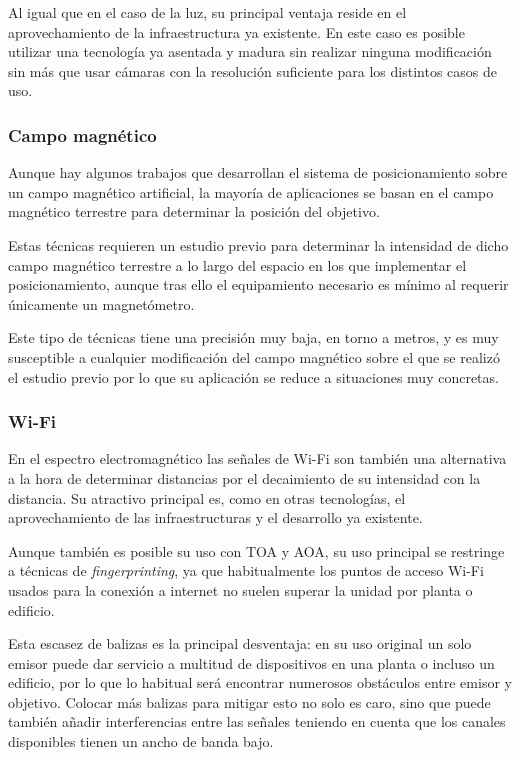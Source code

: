 Al igual que en el caso de la luz, su principal ventaja reside en el aprovechamiento de la infraestructura ya existente.
En este caso es posible utilizar una tecnología ya asentada y madura sin realizar ninguna modificación sin más que usar cámaras con la resolución suficiente para los distintos casos de uso.

\subsubsection{Campo magnético}

Aunque hay algunos trabajos que desarrollan el sistema de posicionamiento sobre un campo magnético artificial, la mayoría de aplicaciones se basan en el campo magnético terrestre para determinar la posición del objetivo.

Estas técnicas requieren un estudio previo para determinar la intensidad de dicho campo magnético terrestre a lo largo del espacio en los que implementar el posicionamiento, aunque tras ello el equipamiento necesario es mínimo al requerir únicamente un magnetómetro.

Este tipo de técnicas tiene una precisión muy baja, en torno a metros, y es muy susceptible a cualquier modificación del campo magnético sobre el que se realizó el estudio previo por lo que su aplicación se reduce a situaciones muy concretas.

\subsubsection{Wi-Fi}

En el espectro electromagnético las señales de Wi-Fi son también una alternativa a la hora de determinar distancias por el decaimiento de su intensidad con la distancia.
Su atractivo principal es, como en otras tecnologías, el aprovechamiento de las infraestructuras y el desarrollo ya existente.

Aunque también es posible su uso con TOA y AOA, su uso principal se restringe a técnicas de \textit{fingerprinting}, ya que habitualmente los puntos de acceso Wi-Fi usados para la conexión a internet no suelen superar la unidad por planta o edificio.

Esta escasez de balizas es la principal desventaja: en su uso original un solo emisor puede dar servicio a multitud de dispositivos en una planta o incluso un edificio, por lo que lo habitual será encontrar numerosos obstáculos entre emisor y objetivo.
Colocar más balizas para mitigar esto no solo es caro, sino que puede también añadir interferencias entre las señales teniendo en cuenta que los canales disponibles tienen un ancho de banda bajo.

